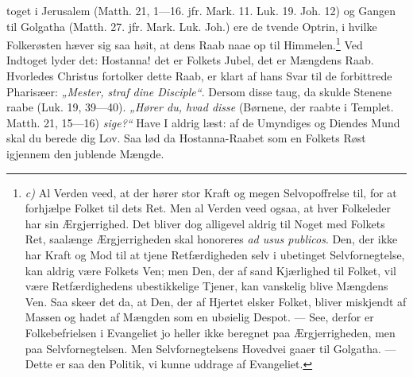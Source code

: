 \documentclass[12pt,a4paper]{book}
\begin{document}
toget i Jerusalem (Matth. 21, 1---16. jfr. Mark. 11. Luk. 19. Joh. 12) og Gangen til
Golgatha (Matth. 27. jfr. Mark. Luk. Joh.) ere de tvende Optrin, i hvilke Folkerøsten
hæver sig saa høit, at dens Raab naae op til Himmelen.\footnote{\textit{c)} Al Verden
veed, at der hører stor Kraft og megen Selvopoffrelse til, for at forhjælpe Folket til
dets Ret. Men al Verden veed ogsaa, at hver Folkeleder har sin Ærgjerrighed. Det bliver
dog alligevel aldrig til Noget med Folkets Ret, saalænge Ærgjerrigheden skal honoreres
\textit{ad usus publicos}. Den, der ikke har Kraft og Mod til at tjene Retfærdigheden
selv i ubetinget Selvfornegtelse, kan aldrig være Folkets Ven; men Den, der af sand
Kjærlighed til Folket, vil være Retfærdighedens ubestikkelige Tjener, kan vanskelig
blive Mængdens Ven. Saa skeer det da, at Den, der af Hjertet elsker Folket, bliver
miskjendt af Massen og hadet af Mængden som en ubøielig Despot. --- See, derfor er
Folkebefrielsen i Evangeliet jo heller ikke beregnet paa Ærgjerrigheden, men paa
Selvfornegtelsen. Men Selvfornegtelsens Hovedvei gaaer til Golgatha. --- Dette er saa
den Politik, vi kunne uddrage af Evangeliet.} Ved Indtoget lyder det: Hostanna! det er
Folkets Jubel, det er Mængdens Raab. Hvorledes Christus fortolker dette Raab, er klart
af hans Svar til de forbittrede Pharisæer: \emph{„Mester, straf dine Disciple“}.
{\large Dersom disse taug, da skulde Stenene raabe (Luk. 19, 39---40).}
\emph{„Hører du, hvad disse} (Børnene, der raabte i Templet. Matth. 21, 15---16)
\emph{sige?“} {\large Have I aldrig læst: af de Umyndiges og Diendes Mund skal du berede
dig Lov.} Saa lød da Hostanna-Raabet som en Folkets Røst igjennem den jublende Mængde.
\end{document}
